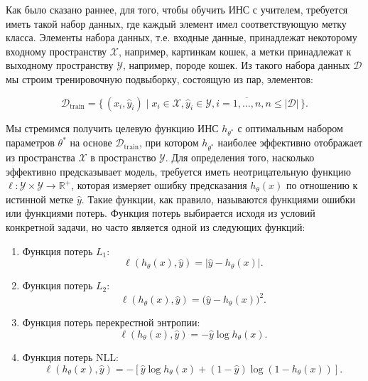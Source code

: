 Как было сказано раннее, для того, чтобы обучить ИНС с учителем, требуется иметь такой набор данных, где каждый элемент имел соответствующую метку класса. Элементы набора данных, т.е. входные данные, принадлежат некоторому входному пространству $\mathcal{X}$, например, картинкам кошек, а метки принадлежат к выходному пространству $\mathcal{Y}$, например, породе кошек. Из такого набора данных $\mathcal{D}$ мы строим тренировочную подвыборку, состоящую из пар, элементов:

\begin{equation}
    \mathcal{D}_{\text{train}} = \{\,(x_i, \hat y_i) \mid x_i \in \mathcal{X}, \hat y_i \in \mathcal{Y}, i=\overline{1, \dots, n}, n \le \lvert \mathcal{D} \rvert\,\}.
\end{equation}

Мы стремимся получить целевую функцию ИНС $h_{\theta^*}$ с оптимальным набором параметров $\theta^*$ на основе $\mathcal{D}_{\text{train}}$, при котором $h_{\theta^*}$ наиболее эффективно отображает из пространства $\mathcal{X}$ в пространство $\mathcal{Y}$. Для определения того, насколько эффективно предсказывает модель, требуется иметь неотрицательную функцию $\ell: \mathcal{Y} \times \mathcal{Y} \rightarrow \mathbb{R}^+$, которая измеряет ошибку предсказания $h_{\theta}(x)$ по отношению к истинной метке $\hat y$. Такие функции, как правило, называются функциями ошибки или функциями потерь. Функция потерь выбирается исходя из условий конкретной задачи, но часто является одной из следующих функций:
\begin{enumerate}
    \item Функция потерь $L_1$:
          \begin{equation}
              \ell\left(h_\theta(x), \hat y\right) = \lvert \hat y - h_\theta(x) \rvert.
          \end{equation}
    \item Функция потерь $L_2$:
          \begin{equation}
              \ell\left(h_\theta(x), \hat y\right) = \big(\hat y - h_\theta(x)\big)^2.
          \end{equation}
    \item Функция потерь перекрестной энтропии:
          \begin{equation}
              \ell\left(h_\theta(x), \hat y\right) = - \hat y\log{h_\theta(x)}.
          \end{equation}
    \item Функция потерь NLL:
          \begin{equation}
              \ell\left(h_\theta(x), \hat y\right) = -\left[\hat y \log{h_\theta(x)} + (1 - \hat y)\log(1 - h_\theta(x))\right].
          \end{equation}
\end{enumerate}

